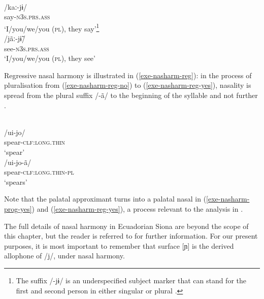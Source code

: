 \documentclass[output=paper]{langscibook}
\begin{document}
\begin{exe}
\ex\label{exe-nasharm-prog}
\begin{xlist}
\ex\label{exe-nasharm-prog-no}
\glll [kaː.jɨ]\\
/kaː-jɨ/ \\
say-\textsc{n3s.prs.ass}\\
\trans `I/you/we/you (\textsc{pl}), they say'\footnote{The suffix /-jɨ/ is an underspecified subject marker that can stand for the first and second person in either singular or plural \citep[177]{Bruil:2014}.}
\ex\label{exe-nasharm-prog-yes}
\glll [ɲãː.ɲɨ]\\
/jãː-j\~ɨ/ \\
see-\textsc{n3s.prs.ass}\\
\trans `I/you/we/you (\textsc{pl}), they see'
\end{xlist}
\end{exe}


Regressive nasal harmony is illustrated in (\ref{exe-nasharm-reg}): in the process of pluralisation from (\ref{exe-nasharm-reg-no}) to (\ref{exe-nasharm-reg-yes}), nasality is spread from the plural suffix /-ã/ to the beginning of the syllable and not further \citep[108]{Bruil:2014}.

\begin{exe}
\ex\label{exe-nasharm-reg}
\begin{xlist}
\ex\label{exe-nasharm-reg-no}
\glll [ui.jo]\\
/ui-jo/\\
spear-\textsc{clf:long.thin}\\
\trans `spear'
\ex\label{exe-nasharm-reg-yes}
\glll [ui.ɲõã]\\
/ui-jo-ã/\\
spear-\textsc{clf:long.thin-pl}\\
\trans `spears'
\end{xlist}
\end{exe}

Note that the palatal approximant turns into a palatal nasal in (\ref{exe-nasharm-prog-yes}) and (\ref{exe-nasharm-reg-yes}), a process relevant to the analysis in .

The full details of nasal harmony in Ecuadorian Siona are beyond the scope of this chapter, but the reader is referred to \citet{BruilStewart:2022} for further information. For our present purposes, it is most important to remember that surface [ɲ] is the derived allophone of /j/, under nasal harmony.
\end{document}
